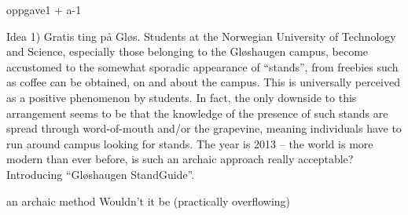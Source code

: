 oppgave1 + a-1

Idea 1)
Gratis ting på Gløs.
Students at the Norwegian University of Technology and Science, 
especially those belonging to the Gløshaugen campus, 
become accustomed to the somewhat sporadic appearance of ``stands'', 
from freebies such as coffee can be obtained, on and about the campus.
This is universally perceived as a positive phenomenon by students.
In fact, the only downside to this arrangement seems to be that the knowledge of the presence of such stands are spread through word-of-mouth and/or the grapevine,
meaning individuals have to run around campus looking for stands.
The year is 2013 -- the world is more modern than ever before, 
is such an archaic approach really acceptable?
Introducing ``Gløshaugen StandGuide''.


an archaic method 
Wouldn't it be 
(practically overflowing)